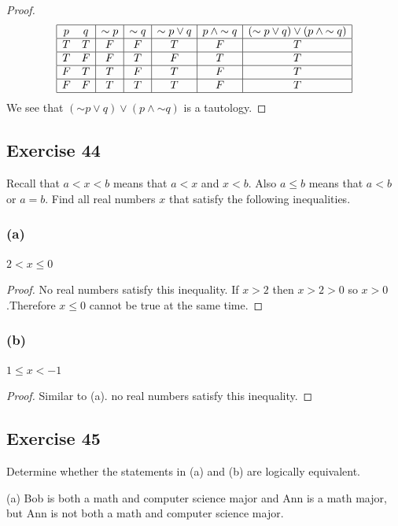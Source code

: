 \documentclass[14pt]{extarticle}
\begin{document}
\begin{proof}
$$
\begin{array}{|cc|c|c|c|c|c|}
\hline
p & q & {\sim p} & {\sim q} & {\sim p} \vee q & p \wedge {\sim q} & ({\sim p} \vee q) \vee (p \wedge {\sim q}) \\
\hline
T & T & F & F & T & F & T \\
\hline
T & F & F & T & F & T & T \\
\hline
F & T & T & F & T & F & T \\
\hline
F & F & T & T & T & F & T \\
\hline
\end{array}
$$
We see that $({\sim p} \vee q) \vee (p \wedge {\sim q})$ is a tautology.
\end{proof}

\subsection{Exercise 44}
Recall that $a < x < b$ means that $a < x$ and $x < b$. Also $a \leq b$ means that $a < b$ or $a = b$. Find all real numbers $x$ that satisfy the following inequalities.

\subsubsection{(a)}
$2 < x \leq 0$

\begin{proof}
No real numbers satisfy this inequality. If $x > 2$ then $x > 2 > 0$ so $x > 0$.Therefore $x \leq 0$ cannot be true at the same time.
\end{proof}

\subsubsection{(b)}
$1 \leq x < -1$

\begin{proof}
Similar to (a). no real numbers satisfy this inequality.
\end{proof}

\subsection{Exercise 45}
Determine whether the statements in (a) and (b) are logically equivalent.

(a) Bob is both a math and computer science major and Ann is a math major, but Ann is not both a math and computer science major.
\end{document}
